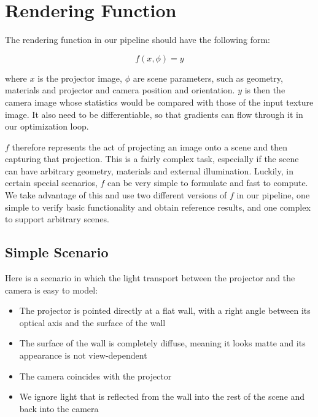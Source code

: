 \section{Rendering Function}
\label{section:methods-rendering_function}

The rendering function in our pipeline should have the following form:

\begin{equation}
    \label{eq:rendering_function}
    f(x, \phi) = y  
\end{equation}

where \(x\) is the projector image, \(\phi\) are scene parameters, such as geometry, materials and projector and camera position and orientation. \(y\) is then the camera image whose statistics would be compared with those of the input texture image. It also need to be differentiable, so that gradients can flow through it in our optimization loop.

\(f\) therefore represents the act of projecting an image onto a scene and then capturing that projection. This is a fairly complex task, especially if the scene can have arbitrary geometry, materials and external illumination. Luckily, in certain special scenarios, \(f\) can be very simple to formulate and fast to compute. We take advantage of this and use two different versions of \(f\) in our pipeline, one simple to verify basic functionality and obtain reference results, and one complex to support arbitrary scenes.

\subsection{Simple Scenario}
\label{section:methods-rendering_function-simple}

Here is a scenario in which the light transport between the projector and the camera is easy to model:

\begin{itemize}
    \item The projector is pointed directly at a flat wall, with a right angle between its optical axis and the surface of the wall
    \item The surface of the wall is completely diffuse, meaning it looks matte and its appearance is not view-dependent
    \item The camera coincides with the projector
    \item We ignore light that is reflected from the wall into the rest of the scene and back into the camera
\end{itemize}

